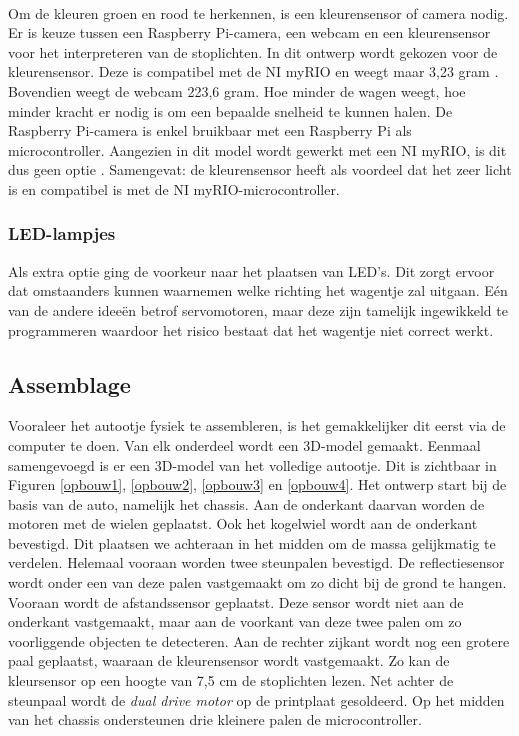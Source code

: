 \documentclass[a4paper,twoside,kulak]{kulakreport} %
\begin{document}
~

Om de kleuren groen en rood te herkennen, is een kleurensensor of camera nodig. Er is keuze tussen een Raspberry Pi-camera, een webcam en een kleurensensor voor het interpreteren van de stoplichten. In dit ontwerp wordt gekozen voor de kleurensensor. Deze is compatibel met de NI myRIO en weegt maar 3,23 gram \cite{Webcam,TCS34725KleurSensorBOB}. Bovendien weegt de webcam 223,6 gram. Hoe minder de wagen weegt, hoe minder kracht er nodig is om een bepaalde snelheid te kunnen halen. De Raspberry Pi-camera is enkel bruikbaar met een Raspberry Pi als microcontroller. Aangezien in dit model wordt gewerkt met een NI myRIO, is dit dus geen optie \cite{RPi-camera}. Samengevat: de kleurensensor heeft als voordeel dat het zeer licht is en compatibel is met de NI myRIO-microcontroller. %



\subsubsection{LED-lampjes}\label{LED-lampjes}
Als extra optie ging de voorkeur naar het plaatsen van LED's. Dit zorgt ervoor dat omstaanders kunnen waarnemen welke richting het wagentje zal uitgaan. Eén van de andere ideeën betrof servomotoren, maar deze zijn tamelijk ingewikkeld te programmeren waardoor het risico bestaat dat het wagentje niet correct werkt.


\subsection{Assemblage}\label{Assemblage}
Vooraleer het autootje fysiek te assembleren, is het gemakkelijker dit eerst via de computer te doen. Van elk onderdeel wordt een 3D-model gemaakt. Eenmaal samengevoegd is er een 3D-model van het volledige autootje. Dit is zichtbaar in Figuren \ref{opbouw1}, \ref{opbouw2}, \ref{opbouw3} en \ref{opbouw4}. %
Het ontwerp start bij de basis van de auto, namelijk het chassis. Aan de onderkant daarvan worden de motoren met de wielen geplaatst. Ook het kogelwiel wordt aan de onderkant bevestigd. Dit plaatsen we achteraan in het midden om de massa gelijkmatig te verdelen. Helemaal vooraan worden twee steunpalen bevestigd. De reflectiesensor wordt onder een van deze palen vastgemaakt om zo dicht bij de grond te hangen. Vooraan wordt de afstandssensor geplaatst. Deze sensor wordt niet aan de onderkant vastgemaakt, maar aan de voorkant van deze twee palen om zo voorliggende objecten te detecteren. Aan de rechter zijkant wordt nog een grotere paal geplaatst, waaraan de kleurensensor wordt vastgemaakt. Zo kan de kleursensor op een hoogte van 7,5 cm de stoplichten lezen. Net achter de steunpaal wordt de {\it dual drive motor} op de printplaat gesoldeerd. Op het midden van het chassis ondersteunen drie kleinere palen de microcontroller. 
\end{document}
